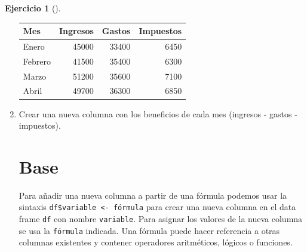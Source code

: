 \documentclass[
  a4paper,
]{scrreport}
\newenvironment{Shaded}{\begin{snugshade}}{\end{snugshade}}
\newcommand{\NormalTok}[1]{\textcolor[rgb]{0.00,0.23,0.31}{#1}}
\newcommand{\OtherTok}[1]{\textcolor[rgb]{0.00,0.23,0.31}{#1}}
\newcommand{\SpecialCharTok}[1]{\textcolor[rgb]{0.37,0.37,0.37}{#1}}
\theoremstyle{definition}
\newtheorem{exercise}{Ejercicio}[chapter]
\theoremstyle{remark}
\begin{document}
\begin{exercise}[]
\begin{enumerate}
\begin{tcolorbox}
  \begin{longtable}[]{@{}lrrr@{}}
  \toprule\noalign{}
  Mes & Ingresos & Gastos & Impuestos \\
  \midrule\noalign{}
  \endhead
  \bottomrule\noalign{}
  \endlastfoot
  Enero & 45000 & 33400 & 6450 \\
  Febrero & 41500 & 35400 & 6300 \\
  Marzo & 51200 & 35600 & 7100 \\
  Abril & 49700 & 36300 & 6850 \\
  \end{longtable}

  \end{tcolorbox}
\item
  Crear una nueva columna con los beneficios de cada mes (ingresos -
  gastos - impuestos).

  \begin{tcolorbox}[enhanced jigsaw, colframe=quarto-callout-tip-color-frame, toprule=.15mm, bottomtitle=1mm, breakable, opacitybacktitle=0.6, toptitle=1mm, colback=white, bottomrule=.15mm, title=\textcolor{quarto-callout-tip-color}{\faLightbulb}\hspace{0.5em}{Solución}, arc=.35mm, left=2mm, titlerule=0mm, rightrule=.15mm, coltitle=black, leftrule=.75mm, opacityback=0, colbacktitle=quarto-callout-tip-color!10!white]

  \section{Base}

  Para añadir una nueva columna a partir de una fórmula podemos usar la
  sintaxis \texttt{df\$variable\ \textless{}-\ fórmula} para crear una
  nueva columna en el data frame \texttt{df} con nombre
  \texttt{variable}. Para asignar los valores de la nueva columna se usa
  la \texttt{fórmula} indicada. Una fórmula puede hacer referencia a
  otras columnas existentes y contener operadores aritméticos, lógicos o
  funciones.

\begin{Shaded}
\end{Shaded}


\end{tcolorbox}
\end{enumerate}
\end{exercise}
\end{document}
